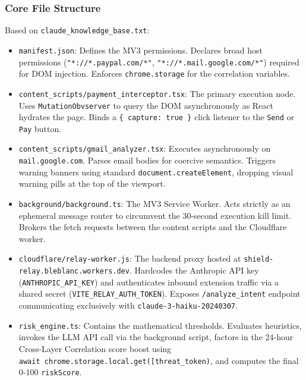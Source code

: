 \documentclass[
]{article}
\providecommand{\tightlist}{%
  \setlength{\itemsep}{0pt}\setlength{\parskip}{0pt}}
\begin{document}
\subsubsection{Core File Structure}\label{core-file-structure}

Based on \texttt{claude\_knowledge\_base.txt}:

\begin{itemize}
\tightlist
\item
  \texttt{manifest.json}: Defines the MV3 permissions. Declares broad
  host permissions (\texttt{"*://*.paypal.com/*"},
  \texttt{"*://*.mail.google.com/*"}) required for DOM injection.
  Enforces \texttt{chrome.storage} for the correlation variables.
\item
  \texttt{content\_scripts/payment\_interceptor.tsx}: The primary
  execution node. Uses \texttt{MutationObvserver} to query the DOM
  asynchronously as React hydrates the page. Binds a
  \texttt{\{\ capture:\ true\ \}} click listener to the \texttt{Send} or
  \texttt{Pay} button.
\item
  \texttt{content\_scripts/gmail\_analyzer.tsx}: Executes asynchronously
  on \texttt{mail.google.com}. Parses email bodies for coercive
  semantics. Triggers warning banners using standard
  \texttt{document.createElement}, dropping visual warning pills at the
  top of the viewport.
\item
  \texttt{background/background.ts}: The MV3 Service Worker. Acts
  strictly as an ephemeral message router to circumvent the 30-second
  execution kill limit. Brokers the fetch requests between the content
  scripts and the Cloudflare worker.
\item
  \texttt{cloudflare/relay-worker.js}: The backend proxy hosted at
  \texttt{shield-relay.bleblanc.workers.dev}. Hardcodes the Anthropic
  API key (\texttt{ANTHROPIC\_API\_KEY}) and authenticates inbound
  extension traffic via a shared secret
  (\texttt{VITE\_RELAY\_AUTH\_TOKEN}). Exposes \texttt{/analyze\_intent}
  endpoint communicating exclusively with
  \texttt{claude-3-haiku-20240307}.
\item
  \texttt{risk\_engine.ts}: Contains the mathematical thresholds.
  Evaluates heuristics, invokes the LLM API call via the background
  script, factors in the 24-hour Cross-Layer Correlation score boost
  using
  \texttt{await\ chrome.storage.local.get({[}\textquotesingle{}threat\_token\textquotesingle{}{]})},
  and computes the final 0-100 \texttt{riskScore}.
\end{itemize}
\end{document}
